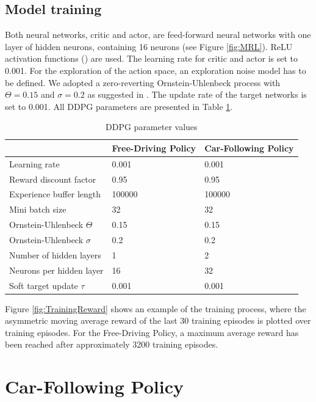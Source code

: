 \documentclass[review]{elsarticle}
\providecommand{\3}{{\ss}}
\begin{document}
\subsection{Model training}
Both neural networks, critic and actor, are feed-forward neural
networks with one layer of hidden neurons, containing 16 neurons (see
Figure \ref{fig:MRL}). ReLU activation functions (\cite{relu}) are used. The learning rate for
critic and actor is set to 0.001. For the exploration of the action
space, an exploration noise model has to be defined. We adopted a
zero-reverting Ornstein-Uhlenbeck process with $\Theta = 0.15$  and $\sigma = 0.2$ as suggested in \cite{DDPG}. The update rate of the target networks is set to 0.001.
All DDPG parameters are presented in Table \ref{tab:DDPGparameters}.
%
  \begin{table}
	\caption{DDPG parameter values} 
	\label{tab:DDPGparameters} 
	\begin{center}
		\begin{tabular}{ p{} p{}  p{} }
			 & Free-Driving Policy & Car-Following Policy \\ \hline
			Learning rate & 0.001 & 0.001\\ 
			Reward discount factor & 0.95 & 0.95 \\ 
			Experience buffer length & 100000 & 100000 \\ 
			Mini batch size & 32 & 32 \\ 			
			Ornstein-Uhlenbeck  $\Theta$ & 0.15& 0.15 \\ 
			Ornstein-Uhlenbeck  $\sigma$ & 0.2 & 0.2 \\ 
			Number of hidden layers & 1 & 2\\
			Neurons per hidden layer & 16 & 32\\
			Soft target update  $\tau$ & 0.001 & 0.001\\
			
			
		\end{tabular}
	\end{center}
\end{table}
%
Figure \ref{fig:TrainingReward} shows an example of the training
process, where the asymmetric moving average reward of the last 30 training episodes is plotted over training episodes. For the Free-Driving Policy, a maximum average reward has been reached after approximately 3200 training episodes.

\section{Car-Following Policy}
\end{document}
